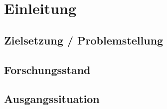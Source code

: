 \chapter{Einleitung}
 
\section{Zielsetzung / Problemstellung}

\section{Forschungsstand}

\section{Ausgangssituation}

